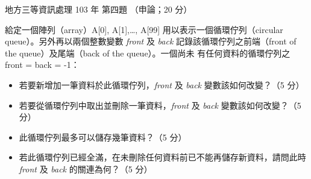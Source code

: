 \begin{pastexam}[label={px:df3-103-ds-04}]{地方三等資訊處理 103 年 第四題}
（申論；20 分）

給定一個陣列（array）A[0], A[1],…, A[99] 用以表示一個循環佇列（circular queue）。另外再以兩個整數變數
\textit{front} 及 \textit{back} 記錄該循環佇列之前端（front of the queue）及尾端（back of the queue）。一個尚未
有任何資料的循環佇列之 front = back = -1：
\begin{itemize}[leftmargin=2.2em, nosep]
\item[㈠] 若要新增加一筆資料於此循環佇列，\textit{front} 及 \textit{back} 變數該如何改變？（5 分）
\item[㈡] 若要從循環佇列中取出並刪除一筆資料，\textit{front} 及 \textit{back} 變數該如何改變？（5 分）
\item[㈢] 此循環佇列最多可以儲存幾筆資料？（5 分）
\item[㈣] 若此循環佇列已經全滿，在未刪除任何資料前已不能再儲存新資料，請問此時 \textit{front} 及 \textit{back}
的關連為何？（5 分）
\end{itemize}
\end{pastexam}

